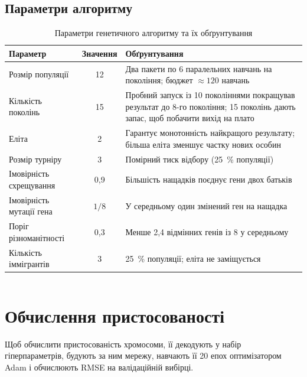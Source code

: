 \documentclass[14pt,a4paper]{extreport}
\begin{document}
\inputminted[firstline=271,lastline=310]{python}{../src/aiit/evolution.py}
\label{lst:nextgen}

\subsection{Параметри алгоритму}

\begin{table}[H]
\caption{Параметри генетичного алгоритму та їх обґрунтування}
\label{tab:gaparams}
\begin{tabularx}{\linewidth}{|l|c|X|}
\hline
\textbf{Параметр} & \textbf{Значення} & \textbf{Обґрунтування} \\
\hline
Розмір популяції & 12 & Два пакети по 6 паралельних навчань на покоління; бюджет $\approx 120$ навчань \\
\hline
Кількість поколінь & 15 & Пробний запуск із 10 поколіннями покращував результат до 8-го покоління; 15 поколінь дають запас, щоб побачити вихід на плато \\
\hline
Еліта & 2 & Гарантує монотонність найкращого результату; більша еліта зменшує частку нових особин \\
\hline
Розмір турніру & 3 & Помірний тиск відбору (25~\% популяції) \\
\hline
Імовірність схрещування & 0,9 & Більшість нащадків поєднує гени двох батьків \\
\hline
Імовірність мутації гена & $1/8$ & У середньому один змінений ген на нащадка \\
\hline
Поріг різноманітності & 0,3 & Менше 2,4 відмінних генів із 8 у середньому \\
\hline
Кількість іммігрантів & 3 & 25~\% популяції; еліта не заміщується \\
\hline
\end{tabularx}
\end{table}

\inputminted[firstline=89,lastline=103]{python}{../src/aiit/run_lab3.py}
\label{lst:gaconfig}

\section{Обчислення пристосованості}

Щоб обчислити пристосованість хромосоми, її декодують у набір гіперпараметрів, будують за ним мережу, навчають її 20 епох оптимізатором Adam і обчислюють RMSE на валідаційній вибірці.
\end{document}
